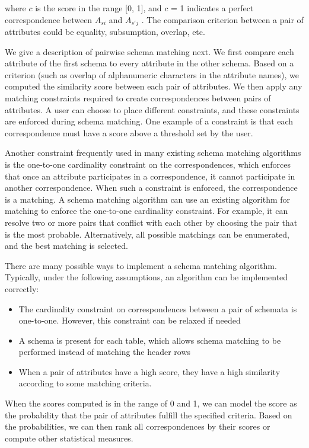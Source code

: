 where $c$ is the score in the range {[}0, 1{]}, and $c$ = 1 indicates a perfect correspondence between $A_{si}$ and $A_{s'j}$ . The comparison criterion between a pair of attributes could be equality, subsumption, overlap, etc.

We give a description of pairwise schema matching next. We first compare each attribute of the first schema to every attribute in the other schema. Based on a criterion (such as overlap of alphanumeric characters in the attribute names), we computed the similarity score between each pair of attributes. We then apply any matching constraints required to create correspondences between pairs of attributes. A user can choose to place different constraints, and these constraints are enforced during schema matching. One example of a constraint is that each correspondence must have a score above a threshold set by the user.

Another constraint frequently used in many existing schema matching algorithms is the one-to-one cardinality constraint on the correspondences, which enforces that once an attribute participates in a correspondence, it cannot participate in another correspondence. When such a constraint is enforced, the correspondence is a matching. A schema matching algorithm can use an existing algorithm for matching to enforce the one-to-one cardinality constraint. For example, it can resolve two or more pairs that conflict with each other by choosing the pair that is the most probable. Alternatively, all possible matchings can be enumerated, and the best matching is selected.

There are many possible ways to implement a schema matching algorithm. Typically, under the following assumptions, an algorithm can be implemented correctly:

\begin{itemize}
\item The cardinality constraint on correspondences between a pair of schemata is one-to-one. However, this constraint can be relaxed if needed
\item A schema is present for each table, which allows schema matching to be performed instead of matching the header rows
\item When a pair of attributes have a high score, they have a high similarity according to some matching criteria.	
\end{itemize}

When the scores computed is in the range of 0 and 1, we can model the score as the probability that the pair of attributes fulfill the specified criteria. Based on the probabilities, we can then rank all correspondences by their scores or compute other statistical measures.

